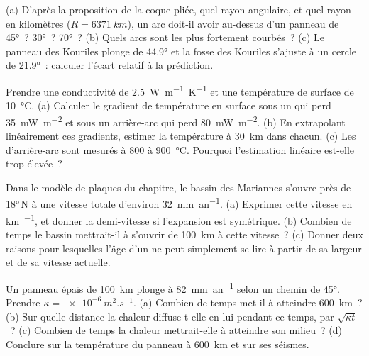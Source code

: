 \begin{exercise}[$\star\star$]\label{exo:b1:active-margins:7}
(a) D'après la proposition de la coque pliée, quel rayon angulaire, et quel rayon en
kilomètres ($R = \qty{6371}{km}$), un arc doit-il avoir au-dessus d'un panneau de 
\ang{45}~? \ang{30}~? \ang{70}~? (b) Quels arcs sont les plus fortement courbés~? (c)
Le panneau des Kouriles plonge de \ang{44.9} et la fosse des Kouriles s'ajuste à un cercle de
\ang{21.9}~: calculer l'écart relatif à la prédiction.
\end{exercise}

\begin{exercise}[$\star\star$]\label{exo:b1:active-margins:8}
Prendre une conductivité de \qty{2.5}{W.m^{-1}.K^{-1}} et une température de surface
de \qty{10}{\celsius}. (a) Calculer le gradient de température en surface sous un
 qui perd \qty{35}{mW.m^{-2}} et sous un arrière-arc qui perd
\qty{80}{mW.m^{-2}}. (b) En extrapolant linéairement ces gradients, estimer la
température à \qty{30}{km} dans chacun. (c) Les  d'arrière-arc sont mesurés à 800 à
\qty{900}{\celsius}. Pourquoi l'estimation linéaire est-elle trop élevée~?
\end{exercise}

\begin{exercise}[$\star\star$]\label{exo:b1:active-margins:9}
Dans le modèle de plaques du chapitre, le bassin des Mariannes s'ouvre près de \ang{18}\,N à
une vitesse totale d'environ \qty{32}{mm.an^{-1}}. (a) Exprimer cette vitesse en
\unit{km.\Ma^{-1}}, et donner la demi-vitesse si l'expansion est symétrique.
(b) Combien de temps le bassin mettrait-il à s'ouvrir de \qty{100}{km} à cette vitesse~?
(c) Donner deux raisons pour lesquelles l'âge d'un  ne peut simplement se lire
à partir de sa largeur et de sa vitesse actuelle.
\end{exercise}

\begin{exercise}[$\star\star\star$]\label{exo:b1:active-margins:10}
Un panneau épais de \qty{100}{km} plonge à \qty{82}{mm.an^{-1}} selon un chemin de 
\ang{45}. Prendre $\kappa = \qty{e-6}{m^2.s^{-1}}$. (a) Combien de temps met-il à
atteindre \qty{600}{km}~? (b) Sur quelle distance la chaleur diffuse-t-elle en lui pendant ce temps, par
$\sqrt{\kappa t}$~? (c) Combien de temps la chaleur mettrait-elle à atteindre son milieu~? (d)
Conclure sur la température du panneau à \qty{600}{km} et sur ses
séismes.
\end{exercise}

